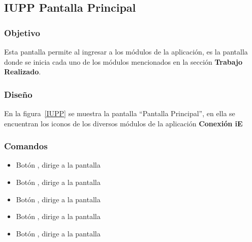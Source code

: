\subsection{IUPP  Pantalla Principal}

\subsubsection{Objetivo}

	
    Esta pantalla permite al  ingresar a los módulos de la aplicación, es la pantalla donde se inicia cada uno de los módulos mencionados en la sección \textbf{Trabajo Realizado}.
\subsubsection{Diseño}


    En la figura~\ref{IUPP} se muestra la pantalla ``Pantalla Principal'', en ella se encuentran los iconos de los diversos módulos de la aplicación \textbf{Conexión iE}



\subsubsection{Comandos}
    \begin{itemize}

	\item Botón \botSalones, dirige a la pantalla 
	\item Botón \botProfesores, dirige a la pantalla 
	\item Botón \botUnidades, dirige a la pantalla 
	\item Botón \botMovilidad, dirige a la pantalla 
	\item Botón \botCursos, dirige a la pantalla 
    \end{itemize}

